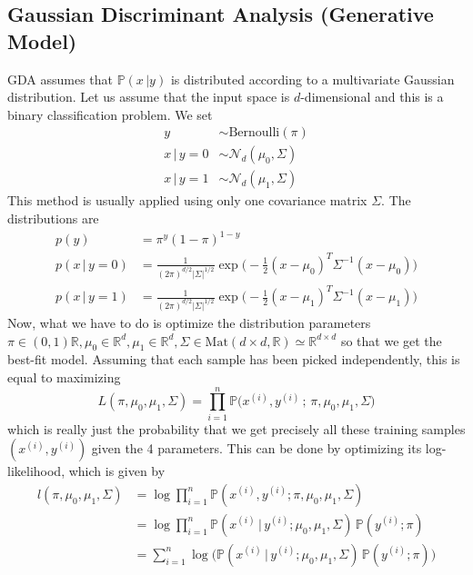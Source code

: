 \documentclass{article}
\theoremstyle{definition}
\begin{document}
  \subsection{Gaussian Discriminant Analysis (Generative Model)}

  GDA assumes that $\mathbb{P}(x\,|y)$ is distributed according to a multivariate Gaussian distribution. Let us assume that the input space is $d$-dimensional and this is a binary classification problem. We set 
  \begin{align*} 
  y & \sim \text{Bernoulli}(\pi) \\
  x\,|\,y = 0 & \sim \mathcal{N}_d (\mu_0, \Sigma) \\
  x\,|\,y = 1 & \sim \mathcal{N}_d (\mu_1, \Sigma)
  \end{align*}
  This method is usually applied using only one covariance matrix $\Sigma$. The distributions are
  \begin{align*}
      p(y) & = \pi^y (1 - \pi)^{1-y} \\
      p(x\,|\,y = 0) & = \frac{1}{(2\pi)^{d/2} |\Sigma|^{1/2}} \exp \bigg(-\frac{1}{2} (x - \mu_0)^T \Sigma^{-1} (x - \mu_0)\bigg) \\
      p(x\,|\,y= 1) & = \frac{1}{(2\pi)^{d/2} |\Sigma|^{1/2}} \exp \bigg(-\frac{1}{2} (x - \mu_1)^T \Sigma^{-1} (x - \mu_1)\bigg)
  \end{align*}
  Now, what we have to do is optimize the distribution parameters $\pi \in (0, 1) \mathbb{R}, \mu_0 \in \mathbb{R}^d, \mu_1 \in \mathbb{R}^d, \Sigma \in \text{Mat}(d \times d, \mathbb{R}) \simeq \mathbb{R}^{d \times d}$ so that we get the best-fit model. Assuming that each sample has been picked independently, this is equal to maximizing 
  \[L(\pi, \mu_0, \mu_1, \Sigma) = \prod_{i=1}^n \mathbb{P}\big( x^{(i)}, y^{(i)}\,;\, \pi, \mu_0, \mu_1, \Sigma\big)\]
  which is really just the probability that we get precisely all these training samples $(x^{(i)}, y^{(i)})$ given the 4 parameters. This can be done by optimizing its log-likelihood, which is given by 
  \begin{align*}
  l(\pi, \mu_0, \mu_1, \Sigma) & = \log \prod_{i=1}^n \mathbb{P}(x^{(i)}, y^{(i)}; \pi, \mu_0, \mu_1, \Sigma) \\
  & = \log \prod_{i=1}^n \mathbb{P}( x^{(i)} \,|\, y^{(i)}; \mu_0, \mu_1, \Sigma) \, \mathbb{P}(y^{(i)}; \pi) \\
  & = \sum_{i=1}^n \log \bigg( \mathbb{P}( x^{(i)} \,|\, y^{(i)}; \mu_0, \mu_1, \Sigma) \, \mathbb{P}(y^{(i)}; \pi) \bigg)
  \end{align*}
\end{document}
